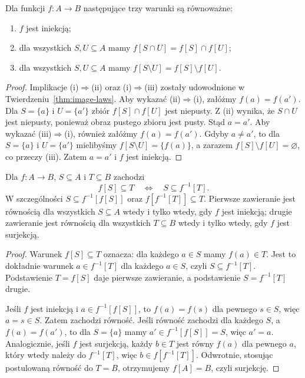 \begin{twierdzenie}
\label{thm:image-injective-characterization-xliv}
Dla funkcji $f:A\to B$ następujące trzy warunki są równoważne:
\begin{enumerate}[label=(\roman*)]
\item $f$ jest iniekcją;
\item dla wszystkich $S,U\subseteq A$ mamy
$f[S\cap U]=f[S]\cap f[U]$;
\item dla wszystkich $S,U\subseteq A$ mamy
$f[S\setminus U]=f[S]\setminus f[U]$.
\end{enumerate}
\end{twierdzenie}
\begin{proof}
Implikacje (i)$\Rightarrow$(ii) oraz (i)$\Rightarrow$(iii)
zostały udowodnione w Twierdzeniu~\ref{thm:image-laws}.
Aby wykazać (ii)$\Rightarrow$(i), załóżmy $f(a)=f(a')$.
Dla $S=\{a\}$ i $U=\{a'\}$ zbiór
$f[S]\cap f[U]$ jest niepusty. Z (ii) wynika, że
$S\cap U$ jest niepusty, ponieważ obraz pustego zbioru
jest pusty. Stąd $a=a'$.
Aby wykazać (iii)$\Rightarrow$(i), również załóżmy
$f(a)=f(a')$. Gdyby $a\ne a'$, to dla
$S=\{a\}$ i $U=\{a'\}$ mielibyśmy
$f[S\setminus U]=\{f(a)\}$, a zarazem
$f[S]\setminus f[U]=\varnothing$, co przeczy (iii).
Zatem $a=a'$ i $f$ jest iniekcją.
\end{proof}

\begin{twierdzenie}\label{thm:image-preimage-adjunction}
Dla $f:A\to B$, $S\subseteq A$ i $T\subseteq B$ zachodzi
\[
f[S]\subseteq T\quad\Longleftrightarrow\quad S\subseteq f^{-1}[T].
\]
W szczególności $S\subseteq f^{-1}[f[S]]$ oraz $f[f^{-1}[T]]\subseteq T$. Pierwsze zawieranie jest równością dla wszystkich $S\subseteq A$ wtedy i tylko wtedy, gdy $f$ jest iniekcją; drugie zawieranie jest równością dla wszystkich $T\subseteq B$ wtedy i tylko wtedy, gdy $f$ jest surjekcją.
\end{twierdzenie}
\begin{proof}
Warunek $f[S]\subseteq T$ oznacza: dla każdego $a\in S$ mamy $f(a)\in T$. Jest to dokładnie warunek $a\in f^{-1}[T]$ dla każdego $a\in S$, czyli $S\subseteq f^{-1}[T]$. Podstawienie $T=f[S]$ daje pierwsze zawieranie, a podstawienie $S=f^{-1}[T]$ drugie.

Jeśli $f$ jest iniekcją i $a\in f^{-1}[f[S]]$, to $f(a)=f(s)$ dla pewnego $s\in S$, więc $a=s\in S$. Zatem zachodzi równość. Jeśli równość zachodzi dla każdego $S$, a $f(a)=f(a')$, to dla $S=\{a\}$ mamy $a'\in f^{-1}[f[S]]=S$, więc $a'=a$. Analogicznie, jeśli $f$ jest surjekcją, każdy $b\in T$ jest równy $f(a)$ dla pewnego $a$, który wtedy należy do $f^{-1}[T]$, więc $b\in f[f^{-1}[T]]$. Odwrotnie, stosując postulowaną równość do $T=B$, otrzymujemy $f[A]=B$, czyli surjekcję.
\end{proof}

